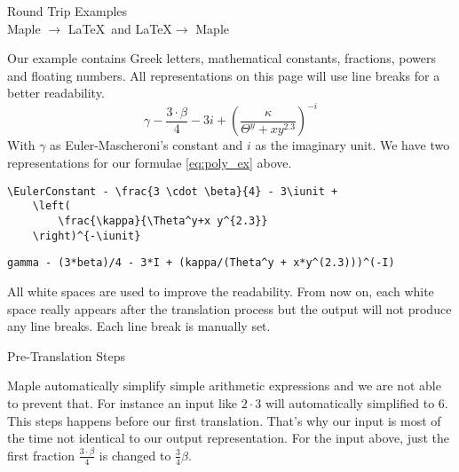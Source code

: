 \documentclass{article}
\newcommand{\iunit}{i}
\newcommand{\EulerConstant}{\gamma}
\begin{document}
\begin{center}
    \Large Round Trip Examples\\[12pt]
    \large Maple $\rightarrow$ \LaTeX\ and \LaTeX $\rightarrow$ Maple
\end{center}

\noindent Our example contains Greek letters, mathematical constants, fractions, powers and floating numbers. All representations on this page will use line breaks for a better readability.
\begin{equation}\label{eq:poly_ex}
\EulerConstant - \frac{3 \cdot \beta}{4} - 3\iunit + 
    \left( 
        \frac{\kappa}{\Theta^y+x y^{2.3}} 
    \right)^{-\iunit} 
\end{equation}
\noindent With $\EulerConstant$ as Euler-Mascheroni's constant and $\iunit$ as the imaginary unit. We have two representations for our formulae \ref{eq:poly_ex} above.
\begin{lstlisting}[mathescape,label=rep_latex,caption={Semantic \LaTeX\ representation of \ref{eq:poly_ex}}]
\EulerConstant - \frac{3 \cdot \beta}{4} - 3\iunit + 
    \left( 
        \frac{\kappa}{\Theta^y+x y^{2.3}} 
    \right)^{-\iunit} 
\end{lstlisting}
\begin{lstlisting}[mathescape,label=rep_maple,caption={Maple's representation of \ref{eq:poly_ex}}]
gamma - (3*beta)/4 - 3*I + (kappa/(Theta^y + x*y^(2.3)))^(-I)
\end{lstlisting}
\noindent All white spaces are used to improve the readability. From now on, each white space really appears after the translation process but the output will not produce any line breaks. Each line break is manually set.

\vspace{12pt}
\begin{center}
    \large Pre-Translation Steps\\
\end{center}
Maple automatically simplify simple arithmetic expressions and we are not able to prevent that. For instance an input like $2 \cdot 3$ will automatically simplified to $6$. This steps happens before our first translation. That's why our input is most of the time not identical to our output representation. For the input above, just the first fraction $\frac{3 \cdot \beta}{4}$ is changed to $\frac{3}{4}\beta$.
\end{document}
